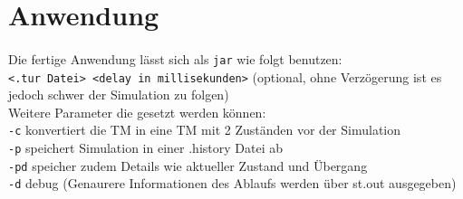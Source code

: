 \documentclass[10pt, a4paper]{article}
\newcommand{\ilc}{\texttt}
\begin{document}
\section*{Anwendung}
\paragraph*{}
Die fertige Anwendung lässt sich als \ilc{jar} wie folgt benutzen:\\
\ilc{<.tur Datei> <delay in millisekunden>} (optional, ohne Verzögerung ist es jedoch schwer der Simulation zu folgen)\\
Weitere Parameter die gesetzt werden können:\\
\ilc{-c} konvertiert die TM in eine TM mit 2 Zuständen vor der Simulation\\
\ilc{-p} speichert Simulation in einer .history Datei ab\\
\ilc{-pd} speicher zudem Details wie aktueller Zustand und Übergang\\
\ilc{-d} debug (Genaurere Informationen des Ablaufs werden über st.out ausgegeben)
\end{document}
